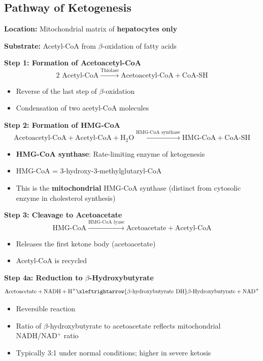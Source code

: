 \subsection{Pathway of Ketogenesis}

\textbf{Location:} Mitochondrial matrix of \textbf{hepatocytes only}

\textbf{Substrate:} Acetyl-CoA from $\beta$-oxidation of fatty acids

\textbf{Step 1: Formation of Acetoacetyl-CoA}
\[
2 \text{ Acetyl-CoA} \xrightarrow{\text{Thiolase}} \text{Acetoacetyl-CoA} + \text{CoA-SH}
\]
\begin{itemize}
    \item Reverse of the last step of $\beta$-oxidation
    \item Condensation of two acetyl-CoA molecules
\end{itemize}

\textbf{Step 2: Formation of HMG-CoA}
\[
\text{Acetoacetyl-CoA} + \text{Acetyl-CoA} + \text{H}_2\text{O} \xrightarrow{\text{HMG-CoA synthase}} \text{HMG-CoA} + \text{CoA-SH}
\]
\begin{itemize}
    \item \textbf{HMG-CoA synthase}: Rate-limiting enzyme of ketogenesis
    \item HMG-CoA = 3-hydroxy-3-methylglutaryl-CoA
    \item This is the \textbf{mitochondrial} HMG-CoA synthase (distinct from cytosolic enzyme in cholesterol synthesis)
\end{itemize}

\textbf{Step 3: Cleavage to Acetoacetate}
\[
\text{HMG-CoA} \xrightarrow{\text{HMG-CoA lyase}} \text{Acetoacetate} + \text{Acetyl-CoA}
\]
\begin{itemize}
    \item Releases the first ketone body (acetoacetate)
    \item Acetyl-CoA is recycled
\end{itemize}

\textbf{Step 4a: Reduction to $\beta$-Hydroxybutyrate}
\[
\text{Acetoacetate} + \text{NADH} + \text{H}^+ \xleftrightarrow{\beta\text{-hydroxybutyrate DH}} \beta\text{-Hydroxybutyrate} + \text{NAD}^+
\]
\begin{itemize}
    \item Reversible reaction
    \item Ratio of $\beta$-hydroxybutyrate to acetoacetate reflects mitochondrial NADH/NAD$^+$ ratio
    \item Typically 3:1 under normal conditions; higher in severe ketosis
\end{itemize}


